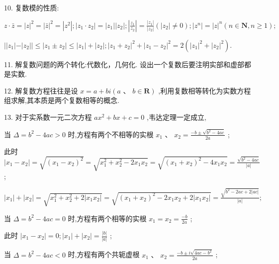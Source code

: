 10. 复数模的性质:

$z \cdot  \bar{z} = {\left| z\right| }^{2} = {\left| \bar{z}\right| }^{2} = \left| {z}^{2}\right| ;\left| {{z}_{1} \cdot  {z}_{2}}\right|  = \left| {z}_{1}\right| \left| {z}_{2}\right| ;\left| \frac{{z}_{1}}{{z}_{2}}\right|  = \frac{\left| {z}_{1}\right| }{\left| {z}_{2}\right| }\left( {\left| {z}_{2}\right|  \neq  0}\right) ;\left| {z}^{n}\right|  = {\left| z\right| }^{n}\left( {n \in  \mathbf{N},n \geq  1}\right) ;$

$\left| \right| {z}_{1}\left| -\right| {z}_{2}\left| \right|  \leq  \left| {{z}_{1} \pm  {z}_{2}}\right|  \leq  \left| {z}_{1}\right|  + \left| {z}_{2}\right| ;{\left| {z}_{1} + {z}_{2}\right| }^{2} + {\left| {z}_{1} - {z}_{2}\right| }^{2} = 2\left( {{\left| {z}_{1}\right| }^{2} + {\left| {z}_{2}\right| }^{2}}\right) .$

11. 解复数问题的两个转化:代数化，几何化. 设出一个复数后要注明实部和虚部都是实数.

12. 解复数方程往往是设 $x = a + b{i}\left( {a\text{ 、 }b \in  \mathbf{R}}\right)$ ,利用复数相等转化为实数方程组求解,其本质是两个复数相等的概念.

13. 对于实系数一元二次方程 $a{x}^{2} + {bx} + c = 0$ ,韦达定理一定成立,

   当 $\Delta  = {b}^{2} - {4ac} > 0$ 时,方程有两个不相等的实根 ${x}_{1}\text{ 、 }{x}_{2} = \frac{-b \pm  \sqrt{{b}^{2} - {4ac}}}{2a}$ ;

此时 $\left| {{x}_{1} - {x}_{2}}\right|  = \sqrt{{\left( {x}_{1} - {x}_{2}\right) }^{2}} = \sqrt{{x}_{1}^{2} + {x}_{2}^{2} - 2{x}_{1}{x}_{2}} = \sqrt{{\left( {x}_{1} + {x}_{2}\right) }^{2} - 4{x}_{1}{x}_{2}} = \frac{\sqrt{{b}^{2} - {4ac}}}{\left| a\right| }$ ;

$\left| {x}_{1}\right|  + \left| {x}_{2}\right|  = \sqrt{{x}_{1}^{2} + {x}_{2}^{2} + 2\left| {{x}_{1}{x}_{2}}\right| } = \sqrt{{\left( {x}_{1} + {x}_{2}\right) }^{2} - 2{x}_{1}{x}_{2} + 2\left| {{x}_{1}{x}_{2}}\right| } = \frac{\sqrt{{b}^{2} - {2ac} + 2\left| {ac}\right| }}{\left| a\right| };$

   当 $\Delta  = {b}^{2} - {4ac} = 0$ 时,方程有两个相等的实根 ${x}_{1} = {x}_{2} = \frac{-b}{2a}$ ;

此时 $\left| {{x}_{1} - {x}_{2}}\right|  = 0;\left| {x}_{1}\right|  + \left| {x}_{2}\right|  = \frac{\left| b\right| }{\left| a\right| }$ ;

   当 $\Delta  = {b}^{2} - {4ac} < 0$ 时,方程有两个共轭虚根 ${x}_{1}\text{ 、 }{x}_{2} = \frac{-b \pm  {i}\sqrt{{4ac} - {b}^{2}}}{2a}$ ;

